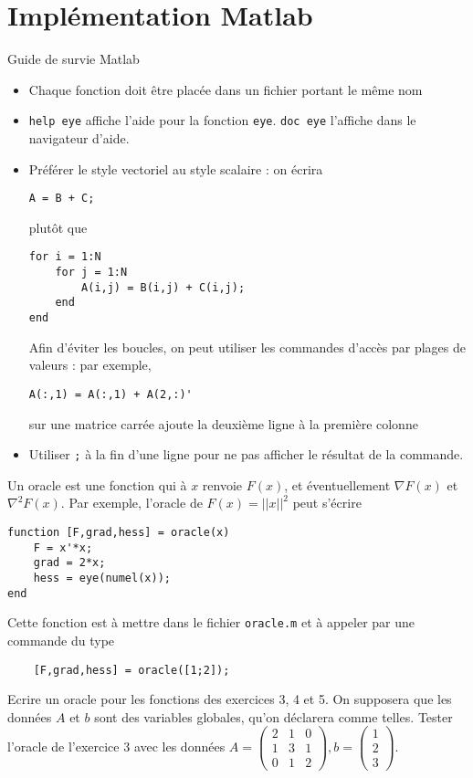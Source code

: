 \documentclass[12pt,a4paper,fleqn]{report}
\begin{document}
\section{Implémentation Matlab}
Guide de survie Matlab
\begin{itemize}
\item Chaque fonction doit être placée dans un fichier portant le même
  nom
\item \verb+help eye+ affiche l'aide pour la fonction
  \verb+eye+. \verb+doc eye+ l'affiche dans le navigateur d'aide.
\item Préférer le style vectoriel au style scalaire : on écrira
\begin{verbatim}
A = B + C;
\end{verbatim} plutôt que
\begin{verbatim}
for i = 1:N
    for j = 1:N
        A(i,j) = B(i,j) + C(i,j);
    end
end
\end{verbatim}

  Afin d'éviter les boucles, on peut utiliser les commandes d'accès
  par plages de valeurs : par exemple,
\begin{verbatim}
A(:,1) = A(:,1) + A(2,:)'
\end{verbatim}
 sur une matrice carrée ajoute la deuxième ligne à la
  première colonne
\item Utiliser \verb+;+ à la fin d'une ligne pour ne pas afficher le
  résultat de la commande.
\end{itemize}

\begin{exercice}
  Un oracle est une fonction qui à $x$ renvoie $F(x)$, et
  éventuellement $\nabla F(x)$ et $\nabla^{2} F(x)$. Par exemple,
  l'oracle de $F(x) = ||x||^{2}$ peut s'écrire
\begin{verbatim}
function [F,grad,hess] = oracle(x)
    F = x'*x;
    grad = 2*x;
    hess = eye(numel(x));
end
\end{verbatim}

Cette fonction est à mettre dans le fichier \verb+oracle.m+ et à
appeler par une commande du type
\begin{verbatim}
    [F,grad,hess] = oracle([1;2]);
\end{verbatim}

Ecrire un oracle pour les fonctions des exercices 3, 4 et 5. On
supposera que les données $A$ et $b$ sont des variables globales,
qu'on déclarera comme telles. Tester l'oracle de l'exercice 3 avec les
données $A = \begin{pmatrix}2&1&0\\1&3&1\\0&1&2\end{pmatrix}, b
= \begin{pmatrix}1\\2\\3\end{pmatrix}$.
\end{exercice}
\end{document}
